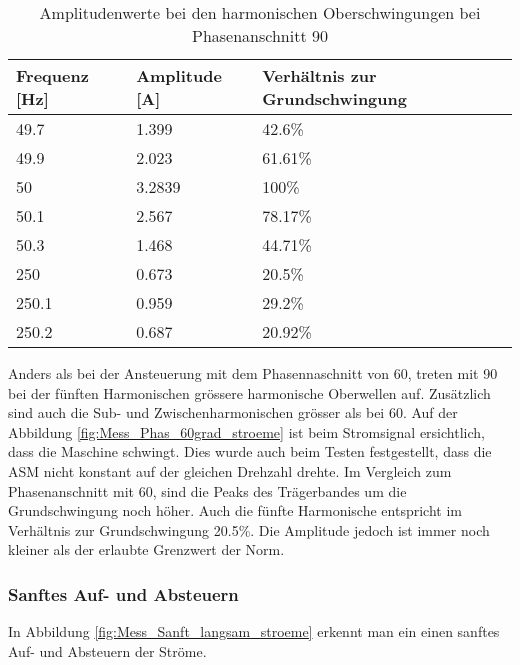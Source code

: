 \begin{table}[ht!]
	\centering
	\begin{tabular}{|l|l|l|}
		\hline
		Frequenz {[}Hz{]} & Amplitude {[}A{]} & Verhältnis zur Grundschwingung	\\ \hline
		49.7              & 1.399             & 42.6\%							\\ \hline
		49.9              & 2.023             & 61.61\%							\\ \hline
		50                & 3.2839            & 100\%							\\ \hline
		50.1              & 2.567             & 78.17\%							\\ \hline
		50.3              & 1.468             & 44.71\%							\\ \hline
		250               & 0.673             & 20.5\%							\\ \hline
		250.1             & 0.959             & 29.2\%							\\ \hline
		250.2             & 0.687             & 20.92\%							\\ \hline
	\end{tabular}
	\caption{Amplitudenwerte bei den harmonischen Oberschwingungen bei Phasenanschnitt 90\textdegree}\label{tab:Phas_90_ASM_stroeme}
\end{table}

Anders als bei der Ansteuerung mit dem Phasennaschnitt von 60\textdegree, treten mit 90\textdegree \hspace{0.02cm} bei der fünften Harmonischen grössere harmonische Oberwellen auf. Zusätzlich sind auch die Sub- und Zwischenharmonischen grösser als bei 60\textdegree. Auf der Abbildung \ref{fig:Mess_Phas_60grad_stroeme} ist beim Stromsignal ersichtlich, dass die Maschine schwingt. Dies wurde auch beim Testen festgestellt, dass die ASM nicht konstant auf der gleichen Drehzahl drehte.
Im Vergleich zum Phasenanschnitt mit 60\textdegree, sind die Peaks des Trägerbandes um die Grundschwingung noch höher. Auch die fünfte Harmonische entspricht im Verhältnis zur Grundschwingung 20.5\%. Die Amplitude jedoch ist immer noch kleiner als der erlaubte Grenzwert der Norm. 


\newpage
\subsubsection*{Sanftes Auf- und Absteuern}

In Abbildung \ref{fig:Mess_Sanft_langsam_stroeme} erkennt man ein einen sanftes Auf- und Absteuern der Ströme.

